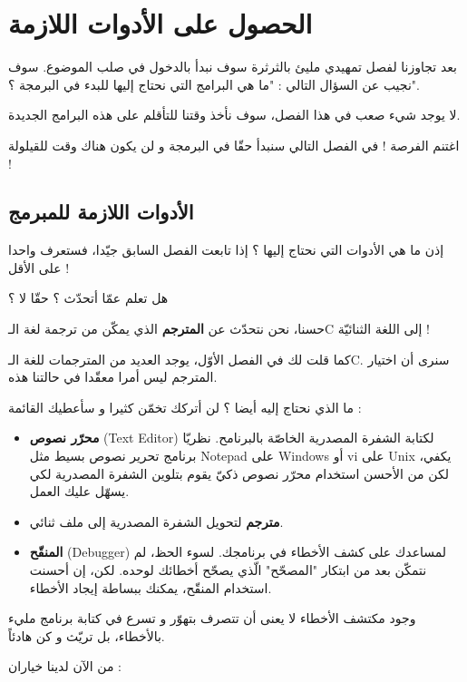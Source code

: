 \chapter{الحصول على الأدوات اللازمة}

بعد تجاوزنا لفصل تمهيدي مليئ بالثرثرة سوف نبدأ بالدخول في صلب الموضوع. سوف نجيب عن السؤال التالي : "ما هي البرامج التي نحتاج إليها للبدء في البرمجة ؟".

لا يوجد شيء صعب في هذا الفصل، سوف نأخذ وقتنا للتأقلم على هذه البرامج الجديدة.

اغتنم الفرصة ! في الفصل التالي سنبدأ حقّا في البرمجة و لن يكون هناك وقت للقيلولة !

\section{الأدوات اللازمة للمبرمج}

إذن ما هي الأدوات التي نحتاج إليها ؟
إذا تابعت الفصل السابق جيّدا، فستعرف واحدا على الأقل !

هل تعلم عمّا أتحدّث ؟ حقّا لا ؟

حسنا، نحن نتحدّث عن
\textbf{المترجم}
الذي يمكّن من ترجمة لغة الـ\textenglish{C}
إلى اللغة الثنائيّة !

كما قلت لك في الفصل الأوّل، يوجد العديد من المترجمات للغة الـ\textenglish{C}.
سنرى أن اختيار المترجم ليس أمرا معقّدا في حالتنا هذه.

ما الذي نحتاج إليه أيضا ؟ لن أتركك تخمّن كثيرا و سأعطيك القائمة :

\begin{itemize}
  \item \textbf{محرّر نصوص }
(\textenglish{Text Editor})
لكتابة الشفرة المصدرية الخاصّة بالبرنامح. نظريّا برنامج تحرير نصوص بسيط مثل
\textenglish{Notepad}
على
\textenglish{Windows}
أو
\textenglish{vi}
على
\textenglish{Unix}
يكفي، لكن من الأحسن استخدام محرّر نصوص ذكيّ يقوم بتلوين الشفرة المصدرية لكي يسهّل عليك العمل.
  \item \textbf{مترجم}
  لتحويل الشفرة المصدرية إلى ملف ثنائي.
  \item \textbf{المنقّح}
(\textenglish{Debugger})
لمساعدك على كشف الأخطاء في برنامجك. لسوء الحظ، لم نتمكّن بعد من ابتكار "المصحّح" الّذي يصحّح أخطائك لوحده. لكن، إن أحسنت استخدام المنقّح، يمكنك ببساطة إيجاد الأخطاء.
\end{itemize}

وجود مكتشف الأخطاء لا يعنى أن تتصرف بتهوّر و تسرع في كتابة برنامج مليء بالأخطاء، بل تريّث و كن هادئاً.

من الآن لدينا خياران :

